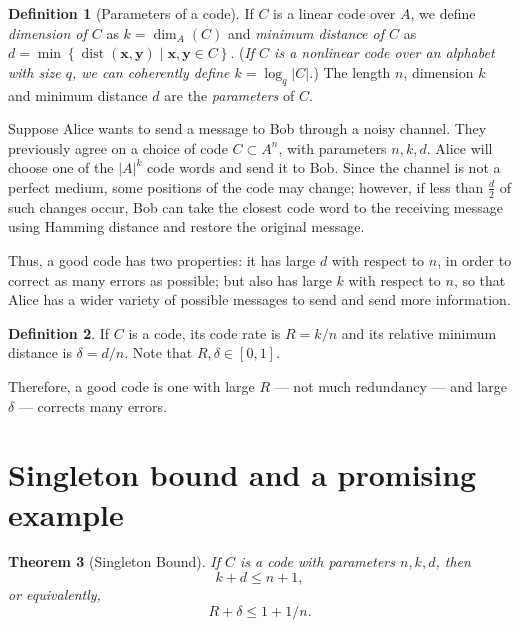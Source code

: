 \documentclass[11pt]{amsart}
\theoremstyle{theorem}
\newtheorem{thm}{Theorem}[section]
\theoremstyle{definition}
\newtheorem{defn}[thm]{Definition}
\theoremstyle{example}
\theoremstyle{remark}
\numberwithin{equation}{section}
\DeclareMathOperator{\dist}{dist}
\DeclareMathOperator{\dimension}{dim}
\begin{document}
\begin{defn}[Parameters of a code]
    If $C$ is a linear code over $A$, we define \emph{dimension of $C$} as $k = \dimension_A(C)$ and \emph{minimum distance of $C$} as $d = \min\left\{\dist(\mathbf{x}, \mathbf{y}) \mid \mathbf{x}, \mathbf{y} \in C\right\}$. (\emph{If $C$ is a nonlinear code over an alphabet with size $q$, we can coherently define $k = \log_q{\left|C\right|}$.}) The length $n$, dimension $k$ and minimum distance $d$ are the \emph{parameters} of $C$.
\end{defn}

Suppose Alice wants to send a message to Bob through a noisy channel. They previously agree on a choice of code $C \subset A^n$, with parameters $n, k, d$. Alice will choose one of the $|A|^k$ code words and send it to Bob. Since the channel is not a perfect medium, some positions of the code may change; however, if less than $\frac{d}{2}$ of such changes occur, Bob can take the closest code word to the receiving message using Hamming distance and restore the original message.

Thus, a good code has two properties: it has large $d$ with respect to $n$, in order to correct as many errors as possible; but also has large $k$ with respect to $n$, so that Alice has a wider variety of possible messages to send and send more information.

\begin{defn}
    If $C$ is a code, its code rate is $R = k/n$ and its relative minimum distance is $\delta = d/n$. Note that $R, \delta \in [0, 1]$.
\end{defn}

Therefore, a good code is one with large $R$ --- not much redundancy --- and large $\delta$ --- corrects many errors. 

\section{Singleton bound and a promising example} \label{s:singleton}
\begin{thm}[Singleton Bound]\label{thm:singleton_bound}
If $C$ is a code with parameters $n, k, d$, then 
	\begin{equation}
		k + d \le n + 1,
	\end{equation} 
	or equivalently, 
	\begin{equation}
		R + \delta \le 1 + 1/n.
	\end{equation}
\end{thm}
\end{document}
